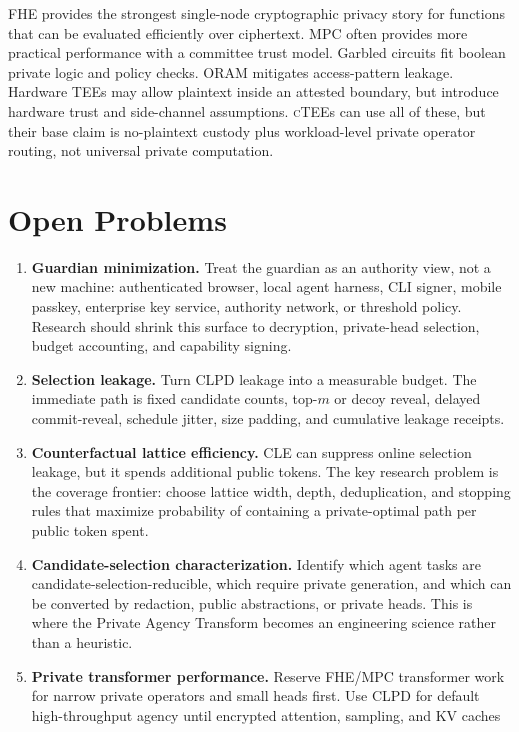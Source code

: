 \documentclass[11pt]{article}
\newcommand{\ctee}{\textnormal{\textsc{cTEE}}}
\begin{document}
FHE provides the strongest single-node cryptographic privacy story for
functions that can be evaluated efficiently over ciphertext. MPC often provides
more practical performance with a committee trust model. Garbled circuits fit
boolean private logic and policy checks. ORAM mitigates access-pattern leakage.
Hardware TEEs may allow plaintext inside an attested boundary, but introduce
hardware trust and side-channel assumptions. \ctee{}s can use all of these, but
their base claim is no-plaintext custody plus workload-level private operator
routing, not universal private computation.

\section{Open Problems}

\begin{enumerate}[leftmargin=1.5em]
\item \textbf{Guardian minimization.} Treat the guardian as an authority view,
not a new machine: authenticated browser, local agent harness, CLI signer,
mobile passkey, enterprise key service, authority network, or threshold policy.
Research should shrink this surface to decryption, private-head selection,
budget accounting, and capability signing.
\item \textbf{Selection leakage.} Turn CLPD leakage into a measurable budget.
The immediate path is fixed candidate counts, top-\(m\) or decoy reveal,
delayed commit-reveal, schedule jitter, size padding, and cumulative leakage
receipts.
\item \textbf{Counterfactual lattice efficiency.} CLE can suppress online
selection leakage, but it spends additional public tokens. The key research
problem is the coverage frontier: choose lattice width, depth, deduplication,
and stopping rules that maximize probability of containing a private-optimal
path per public token spent.
\item \textbf{Candidate-selection characterization.} Identify which agent tasks
are candidate-selection-reducible, which require private generation, and which
can be converted by redaction, public abstractions, or private heads. This is
where the Private Agency Transform becomes an engineering science rather than a
heuristic.
\item \textbf{Private transformer performance.} Reserve FHE/MPC transformer
work for narrow private operators and small heads first. Use CLPD for default
high-throughput agency until encrypted attention, sampling, and KV caches

\end{enumerate}
\end{document}
